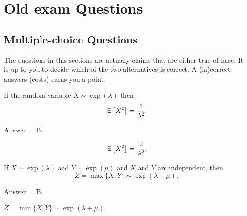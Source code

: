 \section{Old exam Questions}

\subsection{Multiple-choice Questions}

The questions in this sections are actually claims that are either true of false.
It is up to you to decide which of the two alternatives is correct.
A (in)correct answers (costs) earns you a point.

\begin{exercise}[201703] 
  If the random variable $X\sim\exp(\lambda)$ then
  \begin{equation*}
  \,\mathsf{E}\left[X^2\right]= \frac{1}{\lambda^2}.
  \end{equation*}
\begin{solution}
    Answer = B.

  \begin{equation*}
  \,\mathsf{E}\left[X^2\right]= \frac{2}{\lambda^2}.
  \end{equation*}

\end{solution}
\end{exercise}

\begin{exercise}[201703]
  If $X\sim\exp(\lambda)$ and $Y\sim\exp(\mu)$ and $X$ and $Y$ are
  independent, then
  \begin{equation*}
Z=\max\{X,Y\}\sim\exp(\lambda+\mu),
  \end{equation*}
\begin{solution}
    Answer = B.

$Z=\min\{X,Y\} \sim \exp(\lambda+\mu)$.

\end{solution}
\end{exercise}

